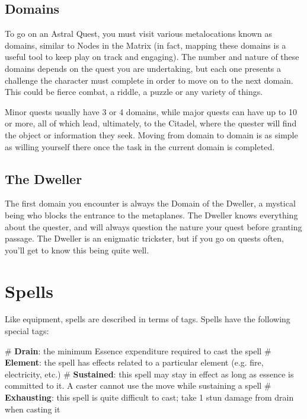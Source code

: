 \subsection{Domains}
To go on an Astral Quest, you must visit various metalocations known as domains, similar to Nodes in the Matrix (in fact, mapping these domains is a useful tool to keep play on track and engaging). The number and nature of these domains depends on the quest you are undertaking, but each one presents a challenge the character must complete in order to move on to the next domain. This could be fierce combat, a riddle, a puzzle or any variety of things.

Minor quests usually have 3 or 4 domains, while major quests can have up to 10 or more, all of which lead, ultimately, to the Citadel, where the quester will find the object or information they seek. Moving from domain to domain is as simple as willing yourself there once the task in the current domain is completed.


\subsection{The Dweller}
The first domain you encounter is always the Domain of the Dweller, a mystical being who blocks the entrance to the metaplanes. The Dweller knows everything about the quester, and will always question the nature your quest before granting passage. The Dweller is an enigmatic trickster, but if you go on quests often, you’ll get to know this being quite well.






\section{Spells}

Like equipment, spells are described in terms of tags. Spells have the following special tags:

\begin{easylist}
    # \textbf{Drain}: the minimum Essence expenditure required to cast the spell
    # \textbf{Element}: the spell has effects related to a particular element (e.g. fire, electricity, etc.)
    # \textbf{Sustained}: this spell may stay in effect as long as essence is committed to it. A caster cannot use the  move while sustaining a spell
    # \textbf{Exhausting}: this spell is quite difficult to cast; take 1 stun damage from drain when casting it
\end{easylist}


